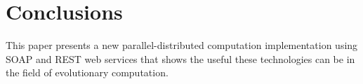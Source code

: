 \documentclass[final,1p,times]{elsarticle}
\begin{document}



\section{Conclusions}
\label{sec:conclusionsAndFutureWork}

This paper presents a new parallel-distributed computation implementation using SOAP and REST web services that shows the useful these technologies can be in the field of evolutionary computation.
\end{document}
